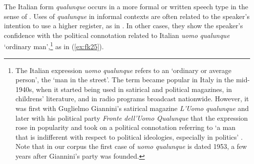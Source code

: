 \documentclass[output=paper,colorlinks,citecolor=brown]{langscibook}
\begin{document}
The Italian form \textit{qualunque} occurs in a more formal or written speech type in the sense of \citet{KochOesterreicher2011}. Uses of \textit{qualunque} in informal contexts are often related to the speaker’s intention to use a higher register, as in . In other cases, they show the speaker’s confidence with the political connotation related to Italian \textit{uomo qualunque} ‘ordinary man’,\footnote{The Italian expression \textit{uomo qualunque} refers to an ‘ordinary or average person’, the ‘man in the street’. The term became popular in Italy in the mid-1940s, when it started being used in satirical and political magazines, in childrens’ literature, and in radio programs broadcast nationwide. However, it was first with Guglielmo Giannini’s satirical magazine \textit{L’Uomo qualunque} and later with his political party \textit{Fronte dell’Uomo Qualunque} that the expression rose in popularity \citep[see][1010]{CortellazzoZolli1996} and took on a political connotation referring to ‘a man that is indifferent with respect to political ideologies, especially in politics’ \citep[see][396]{Cocco2014}. Note that in our corpus the first case of \textit{uomo qualunque} is dated 1953, a few years after Giannini’s party was founded.}  as in (\ref{ex:fk25}).
\end{document}
